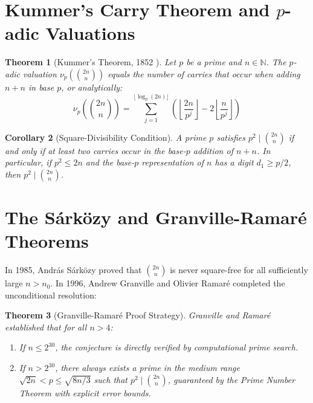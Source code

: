 \documentclass[11pt,a4paper]{article}
\newtheorem{theorem}{Theorem}[section]
\newtheorem{corollary}[theorem]{Corollary}
\theoremstyle{definition}
\begin{document}
\section{Kummer's Carry Theorem and $p$-adic Valuations}

\begin{theorem}[Kummer's Theorem, 1852 \cite{kummer1852}]\label{thm:kummer}
Let $p$ be a prime and $n \in \mathbb{N}$.
The $p$-adic valuation $\nu_p\left(\binom{2n}{n}\right)$ equals the number of carries that occur when adding $n + n$ in base $p$, or analytically:
\begin{equation}\label{eq:kummer_formula}
\nu_p\left( \binom{2n}{n} \right) = \sum_{j=1}^{\lfloor \log_p(2n) \rfloor} \left( \left\lfloor \frac{2n}{p^j} \right\rfloor - 2 \left\lfloor \frac{n}{p^j} \right\rfloor \right)
\end{equation}
\end{theorem}

\begin{corollary}[Square-Divisibility Condition]\label{cor:carry_two}
A prime $p$ satisfies $p^2 \mid \binom{2n}{n}$ if and only if at least two carries occur in the base-$p$ addition of $n + n$.
In particular, if $p^2 \le 2n$ and the base-$p$ representation of $n$ has a digit $d_1 \ge p/2$, then $p^2 \mid \binom{2n}{n}$.
\end{corollary}

\section{The S\'ark\"ozy and Granville-Ramar\'e Theorems}

In 1985, Andr\'as S\'ark\"ozy \cite{sarkozy1985} proved that $\binom{2n}{n}$ is never square-free for all sufficiently large $n > n_0$.
In 1996, Andrew Granville and Olivier Ramar\'e \cite{granville1996} completed the unconditional resolution:

\begin{theorem}[Granville-Ramar\'e Proof Strategy]\label{thm:gr_strategy}
Granville and Ramar\'e established that for all $n > 4$:
\begin{enumerate}
    \item If $n \le 2^{30}$, the conjecture is directly verified by computational prime search.
    \item If $n > 2^{30}$, there always exists a prime in the medium range $\sqrt{2n} < p \le \sqrt{8n/3}$ such that $p^2 \mid \binom{2n}{n}$, guaranteed by the Prime Number Theorem with explicit error bounds.
\end{enumerate}
\end{theorem}
\end{document}
